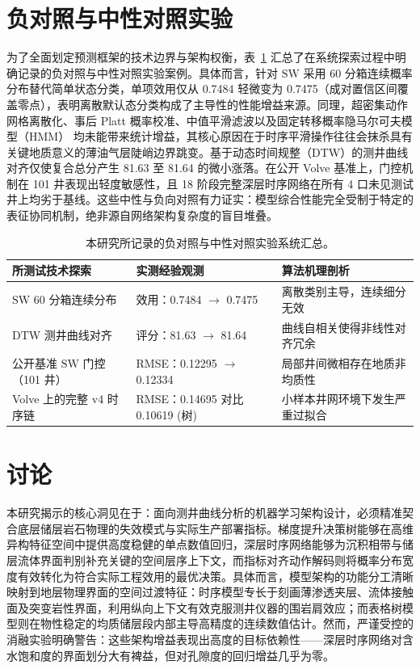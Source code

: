 \documentclass[preprint,12pt,nopreprintline]{elsarticle}
\begin{document}
\section{负对照与中性对照实验}
\label{sec:negative}
为了全面划定预测框架的技术边界与架构权衡，表~\ref{tab:negative} 汇总了在系统探索过程中明确记录的负对照与中性对照实验案例。具体而言，针对 $\mathrm{SW}$ 采用 60 分箱连续概率分布替代简单状态分类，单项效用仅从 0.7484 轻微变为 0.7475（成对置信区间覆盖零点），表明离散默认态分类构成了主导性的性能增益来源。同理，超密集动作网格离散化、事后 Platt 概率校准、中值平滑滤波以及固定转移概率隐马尔可夫模型（HMM）\cite{rabiner1989hmm} 均未能带来统计增益，其核心原因在于时序平滑操作往往会抹杀具有关键地质意义的薄油气层陡峭边界跳变。基于动态时间规整（DTW）的测井曲线对齐仅使复合总分产生 81.63 至 81.64 的微小涨落。在公开 Volve 基准上，门控机制在 101 井表现出轻度敏感性，且 18 阶段完整深层时序网络在所有 4 口未见测试井上均劣于基线。这些中性与负向对照有力证实：模型综合性能完全受制于特定的表征协同机制，绝非源自网络架构复杂度的盲目堆叠。

\begin{table}[t]
\centering
\caption{本研究所记录的负对照与中性对照实验系统汇总。}
\label{tab:negative}
\footnotesize
\begin{tabular}{>{\raggedright\arraybackslash}p{}>{\raggedright\arraybackslash}p{}>{\raggedright\arraybackslash}p{}}
\toprule
所测试技术探索 & 实测经验观测 & 算法机理剖析 \\
\midrule
$\mathrm{SW}$ 60 分箱连续分布 & 效用：0.7484 $\to$ 0.7475 & 离散类别主导，连续细分无效 \\
DTW 测井曲线对齐 & 评分：81.63 $\to$ 81.64 & 曲线自相关使得非线性对齐冗余 \\
公开基准 $\mathrm{SW}$ 门控（101 井） & RMSE：0.12295 $\to$ 0.12334 & 局部井间微相存在地质非均质性 \\
Volve 上的完整 v4 时序链 & RMSE：0.14695 对比 0.10619 (树) & 小样本井网环境下发生严重过拟合 \\
\bottomrule
\end{tabular}
\end{table}

\section{讨论}
\label{sec:discussion}
本研究揭示的核心洞见在于：面向测井曲线分析的机器学习架构设计，必须精准契合底层储层岩石物理的失效模式与实际生产部署指标。梯度提升决策树能够在高维异构特征空间中提供高度稳健的单点数值回归，深层时序网络能够为沉积相带与储层流体界面判别补充关键的空间层序上下文，而指标对齐动作解码则将概率分布宽度有效转化为符合实际工程效用的最优决策。具体而言，模型架构的功能分工清晰映射到地层物理界面的空间过渡特征：时序模型专长于刻画薄渗透夹层、流体接触面及突变岩性界面，利用纵向上下文有效克服测井仪器的围岩肩效应；而表格树模型则在物性稳定的均质储层段内部主导高精度的连续数值估计。然而，严谨受控的消融实验明确警告：这些架构增益表现出高度的目标依赖性——深层时序网络对含水饱和度的界面划分大有裨益，但对孔隙度的回归增益几乎为零。
\end{document}
